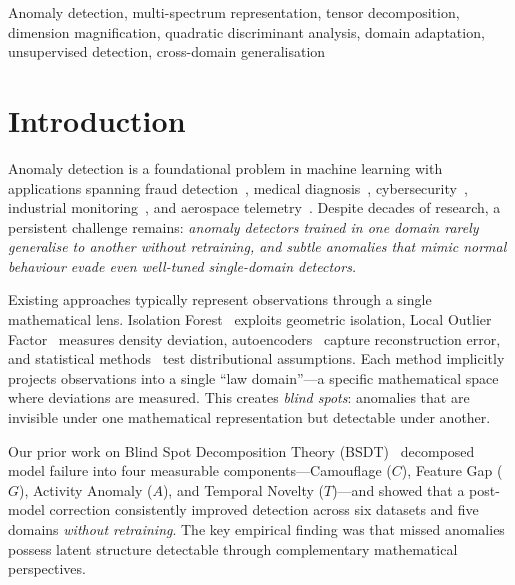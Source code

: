\documentclass[journal]{IEEEtran}
\begin{document}
\begin{IEEEkeywords}
Anomaly detection, multi-spectrum representation, tensor decomposition, dimension magnification, quadratic discriminant analysis, domain adaptation, unsupervised detection, cross-domain generalisation
\end{IEEEkeywords}

\section{Introduction}
\label{sec:introduction}

Anomaly detection is a foundational problem in machine learning with applications spanning fraud detection~\cite{ahmed2016survey}, medical diagnosis~\cite{fernando2021deep}, cybersecurity~\cite{chandola2009anomaly}, industrial monitoring~\cite{pang2021deep}, and aerospace telemetry~\cite{hundman2018detecting}. Despite decades of research, a persistent challenge remains: \textit{anomaly detectors trained in one domain rarely generalise to another without retraining, and subtle anomalies that mimic normal behaviour evade even well-tuned single-domain detectors.}

Existing approaches typically represent observations through a single mathematical lens. Isolation Forest~\cite{liu2008isolation} exploits geometric isolation, Local Outlier Factor~\cite{breunig2000lof} measures density deviation, autoencoders~\cite{an2015variational} capture reconstruction error, and statistical methods~\cite{chandola2009anomaly} test distributional assumptions. Each method implicitly projects observations into a single ``law domain''---a specific mathematical space where deviations are measured. This creates \textit{blind spots}: anomalies that are invisible under one mathematical representation but detectable under another.

Our prior work on Blind Spot Decomposition Theory (BSDT)~\cite{odeyemi2025bsdt} decomposed model failure into four measurable components---Camouflage ($C$), Feature Gap ($G$), Activity Anomaly ($A$), and Temporal Novelty ($T$)---and showed that a post-model correction consistently improved detection across six datasets and five domains \textit{without retraining}. The key empirical finding was that missed anomalies possess latent structure detectable through complementary mathematical perspectives.
\end{document}
